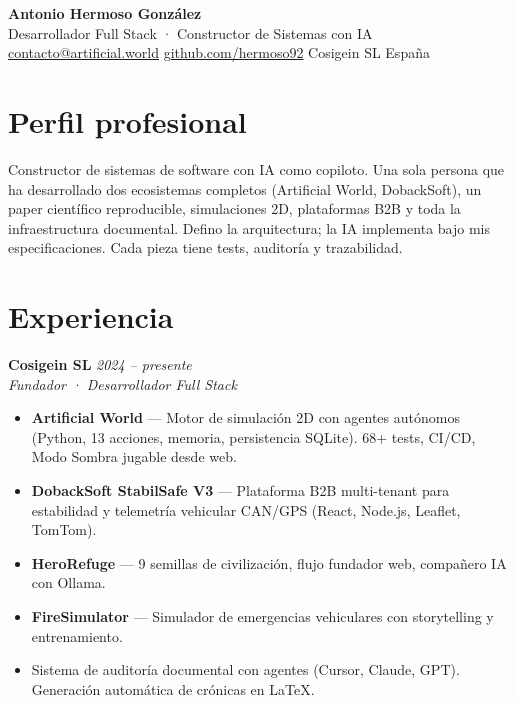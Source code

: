 \documentclass[10pt,a4paper]{article}
\begin{document}

\begin{center}
  {\LARGE\bfseries\color{dark} Antonio Hermoso González}\\[2pt]
  {\large\color{accent} Desarrollador Full Stack · Constructor de Sistemas con IA}\\[6pt]
  \small
  \href{mailto:contacto@artificial.world}{contacto@artificial.world} \quad\textperiodcentered\quad
  \href{https://github.com/hermoso92}{github.com/hermoso92} \quad\textperiodcentered\quad
  Cosigein SL \quad\textperiodcentered\quad
  España
\end{center}

\vspace{4pt}

\section*{Perfil profesional}
Constructor de sistemas de software con IA como copiloto. Una sola persona que ha desarrollado dos ecosistemas completos (Artificial World, DobackSoft), un paper científico reproducible, simulaciones 2D, plataformas B2B y toda la infraestructura documental. Defino la arquitectura; la IA implementa bajo mis especificaciones. Cada pieza tiene tests, auditoría y trazabilidad.

\vspace{2pt}

\section*{Experiencia}

\textbf{Cosigein SL} \hfill \textit{2024 -- presente}\\
\textit{Fundador · Desarrollador Full Stack}

\begin{itemize}[leftmargin=1.2em, itemsep=1pt, topsep=2pt]
  \item \textbf{Artificial World} --- Motor de simulación 2D con agentes autónomos (Python, 13 acciones, memoria, persistencia SQLite). 68+ tests, CI/CD, Modo Sombra jugable desde web.
  \item \textbf{DobackSoft StabilSafe V3} --- Plataforma B2B multi-tenant para estabilidad y telemetría vehicular CAN/GPS (React, Node.js, Leaflet, TomTom).
  \item \textbf{HeroRefuge} --- 9 semillas de civilización, flujo fundador web, compañero IA con Ollama.
  \item \textbf{FireSimulator} --- Simulador de emergencias vehiculares con storytelling y entrenamiento.
  \item Sistema de auditoría documental con agentes (Cursor, Claude, GPT). Generación automática de crónicas en LaTeX.
\end{itemize}
\end{document}
